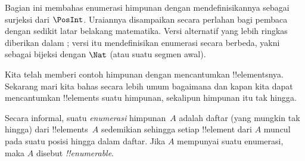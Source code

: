 \documentclass[../../../include/open-logic-section]{subfiles}
\begin{document}


\begin{editorial}
  Bagian ini membahas enumerasi himpunan dengan mendefinisikannya sebagai
  surjeksi dari $\PosInt$. Uraiannya disampaikan secara perlahan bagi pembaca
  dengan sedikit latar belakang matematika. Versi alternatif yang lebih
  ringkas diberikan dalam ; versi itu mendefinisikan
  enumerasi secara berbeda, yakni sebagai bijeksi dengan $\Nat$ (atau suatu
  segmen awal).
\end{editorial}

\begin{explain}
Kita telah memberi contoh himpunan dengan mencantumkan !!{element}snya.
Sekarang mari kita bahas secara lebih umum bagaimana dan kapan kita dapat
mencantumkan !!{element}s suatu himpunan, sekalipun himpunan itu tak hingga.
\end{explain}

\begin{defn}
Secara informal, suatu \emph{enumerasi} himpunan~$A$ adalah daftar (yang
mungkin tak hingga) dari !!{element}s~$A$ sedemikian sehingga setiap
!!{element} dari $A$ muncul pada suatu posisi hingga dalam daftar. Jika $A$
mempunyai suatu enumerasi, maka $A$ disebut \emph{!!{enumerable}}.
\end{defn}
\end{document}
